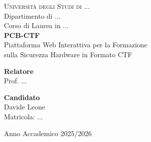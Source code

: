 \documentclass[a4paper,12pt,oneside]{book}
\begin{document}
\begin{titlepage}
  \centering
  \vspace*{2cm}

  {\Large\textsc{Università degli Studi di ...}}\\[0.5cm]
  {\large Dipartimento di ...}\\[0.3cm]
  {\large Corso di Laurea in ...}\\[3cm]

  {\LARGE\bfseries PCB-CTF}\\[0.4cm]
  {\Large Piattaforma Web Interattiva per la Formazione\\sulla Sicurezza Hardware in Formato CTF}\\[3cm]

  \begin{minipage}{0.45\textwidth}
    \begin{flushleft}
      \textbf{Relatore}\\
      Prof. ...
    \end{flushleft}
  \end{minipage}
  \hfill
  \begin{minipage}{0.45\textwidth}
    \begin{flushright}
      \textbf{Candidato}\\
      Davide Leone\\
      Matricola: ...
    \end{flushright}
  \end{minipage}

  \vfill
  {\large Anno Accademico 2025/2026}
\end{titlepage}

\frontmatter
\tableofcontents

\mainmatter



% 








% 
% 

\appendix


\end{document}
